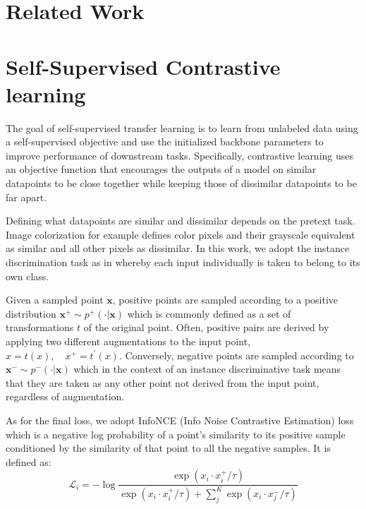 \documentclass[10pt,twocolumn,letterpaper]{article}
\begin{document}
\section{Related Work}
\label{sec:relatedWork}




\section{Self-Supervised Contrastive learning}
\label{sec:contrastiveLearning}

The goal of self-supervised transfer learning is to learn from unlabeled data using a self-supervised objective and use the initialized backbone parameters to improve performance of downstream tasks. Specifically, contrastive learning uses an objective function that encourages the outputs of a model on similar datapoints to be close together while keeping those of dissimilar datapoints to be far apart.

Defining what datapoints are similar and dissimilar depends on the pretext task. Image colorization for example defines color pixels and their grayscale equivalent as similar and all other pixels as dissimilar. In this work, we adopt the instance discrimination task as in \cite{} whereby each input individually is taken to belong to its own class.

Given a sampled point $\mathbf{x}$, positive points are sampled according to a positive distribution $\mathbf{x}^{+} \sim p^{+}( \cdot | \mathbf{x})$ which is commonly defined as a set of transformations $t$ of the original point. Often, positive pairs are derived by applying two different augmentations to the input point, $x = t(x), \quad x^{+} = t^{'}(x)$. Conversely, negative points are sampled according to $\mathbf{x}^{-} \sim p^{-}( \cdot | \mathbf{x})$ which in the context of an instance discriminative task means that they are taken as any other point not derived from the input point, regardless of augmentation.

As for the final loss, we adopt InfoNCE (Info Noise Contrastive Estimation) loss which is a negative log probability of a point's similarity to its positive sample conditioned by the similarity of that point to all the negative samples. It is defined as:
\begin{equation}
    \mathcal{L}_{i} = -\log \frac{\exp(x_{i} \cdot x^{+}_{i} / \tau)}{\exp(x_{i} \cdot x^{+}_{i} / \tau) + \sum^{K}_{j}\exp(x_{i} \cdot x^{-}_{j} / \tau)}
    \label{eq:contrastive_loss}
\end{equation}
\end{document}
